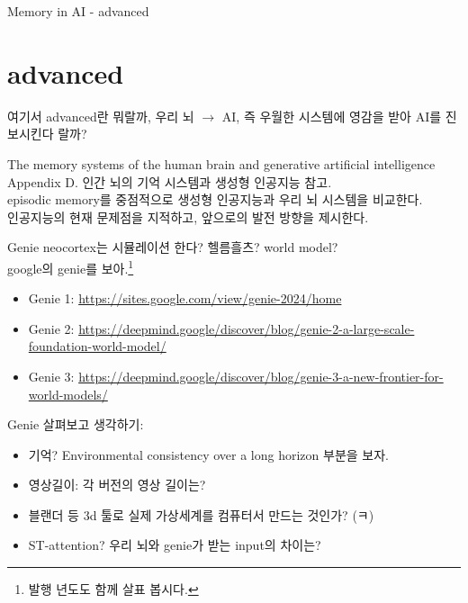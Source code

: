 \documentclass{beamer}
\begin{document}
\begin{frame}{Memory in AI - advanced}
  \section{advanced}
  여기서 advanced란 뭐랄까, 우리 뇌 $\rightarrow$ AI, 즉 우월한 시스템에 영감을 받아 AI를 진보시킨다 랄까?
  \begin{block}{The memory systems of the human brain and generative artificial intelligence}
    Appendix D. 인간 뇌의 기억 시스템과 생성형 인공지능 참고.\\
    episodic memory를 중점적으로 생성형 인공지능과 우리 뇌 시스템을 비교한다.\\
    인공지능의 현재 문제점을 지적하고, 앞으로의 발전 방향을 제시한다.
  \end{block}

  \begin{block}{Genie}
    neocortex는 시뮬레이션 한다? 헬름흘츠? world model?\\
    google의 genie를 보아.\footnote{발행 년도도 함께 살표 봅시다.}\\
    \begin{itemize}
      \item Genie 1: \url{https://sites.google.com/view/genie-2024/home}
      \item Genie 2: \url{https://deepmind.google/discover/blog/genie-2-a-large-scale-foundation-world-model/}
      \item Genie 3: \url{https://deepmind.google/discover/blog/genie-3-a-new-frontier-for-world-models/}
    \end{itemize}
  \end{block}
\end{frame}

\begin{frame}
  \begin{block}{Genie}
    살펴보고 생각하기:
    \begin{itemize}
      \item 기억? Environmental consistency over a long horizon 부분을 보자.
      \item 영상길이: 각 버전의 영상 길이는?
      \item 블랜더 등 3d 툴로 실제 가상세계를 컴퓨터서 만드는 것인가? (ㅋ)
      \item ST-attention? 우리 뇌와 genie가 받는 input의 차이는?
    \end{itemize}
  \end{block}
\end{frame}
\end{document}
